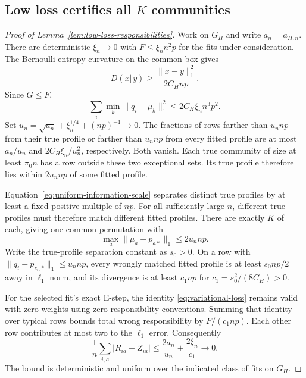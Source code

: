 \subsection{Low loss certifies all \texorpdfstring{$K$}{K} communities}
\begin{proof}[Proof of Lemma~\ref{lem:low-loss-responsibilities}]
Work on $G_H$ and write $a_n=a_{H,n}$. There are deterministic $\xi_n\to0$ with $F\le\xi_n n^2p$ for the fits under consideration. The Bernoulli entropy curvature on the common box gives
\[
 D(x\Vert y)\ge\frac{\|x-y\|_1^2}{2C_Hnp}.
\]
Since $G\le F$,
\[
 \sum_i\min_k\|q_i-\mu_k\|_1^2\le2C_H\xi_n n^3p^2.
\]
Set $u_n=\sqrt{a_n}+\xi_n^{1/4}+(np)^{-1}\to0$. The fractions of rows farther than $u_n np$ from their true profile or farther than $u_n np$ from every fitted profile are at most $a_n/u_n$ and $2C_H\xi_n/u_n^2$, respectively. Both vanish. Each true community of size at least $\pi_0n$ has a row outside these two exceptional sets. Its true profile therefore lies within $2u_n np$ of some fitted profile.

Equation~\eqref{eq:uniform-information-scale} separates distinct true profiles by at least a fixed positive multiple of $np$. For all sufficiently large $n$, different true profiles must therefore match different fitted profiles. There are exactly $K$ of each, giving one common permutation with
\begin{equation}
 \max_a\|\mu_a-p_{a*}\|_1\le2u_n np.
 \label{eq:matched-profiles}
\end{equation}
Write the true-profile separation constant as $s_0>0$. On a row with $\|q_i-p_{z_i,*}\|_1\le u_n np$, every wrongly matched fitted profile is at least $s_0np/2$ away in $\ell_1$ norm, and its divergence is at least $c_1np$ for $c_1=s_0^2/(8C_H)>0$.

For the selected fit's exact E-step, the identity \eqref{eq:variational-loss} remains valid with zero weights using zero-responsibility conventions. Summing that identity over typical rows bounds total wrong responsibility by $F/(c_1np)$. Each other row contributes at most two to the $\ell_1$ error. Consequently
\[
 \frac1n\sum_{i,a}|R_{ia}-Z_{ia}|
 \le\frac{2a_n}{u_n}+\frac{2\xi_n}{c_1}\longrightarrow0.
\]
The bound is deterministic and uniform over the indicated class of fits on $G_H$.
\end{proof}

